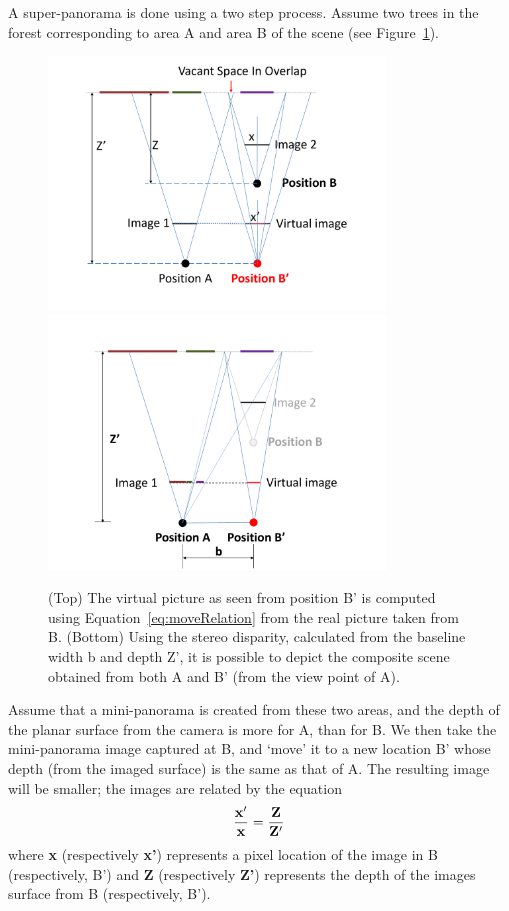A super-panorama is done using a two step process. Assume two trees in
the forest corresponding to area A and area B of the scene (see
Figure~\ref{fig:stereo}). 
\begin{figure}[h!]
  \centering
  \includegraphics[width=0.8\textwidth]{figures/move} \\
  \includegraphics[width=0.8\textwidth]{figures/stereo} 
  \caption[Creation of Super-panoramas]{ \label{fig:stereo} (Top) The virtual
  picture as seen from position B' is computed using Equation~\ref{eq:moveRelation} from the real picture
    taken from B.  (Bottom) Using the stereo disparity, calculated from the baseline 
   width b and depth Z',  it is possible to depict the composite scene obtained from both A
  and B' (from the view point of A).}
\end{figure}    
Assume that a mini-panorama is created from these two areas, and the
depth of the planar surface from the camera is more for A, than for
B. We then take the mini-panorama image captured at B, and `move' it to
a new location B' whose depth (from the imaged surface) is the same as
that of A. The resulting image  will be smaller; the images are
related by the equation
\begin{equation}
  \label{eq:moveRelation}
  {\bf \frac{x'}{x} = \frac{Z}{Z'}}
\end{equation}
where {\bf x} (respectively {\bf x'}) represents a pixel location of
the image in B (respectively, B') and 
{\bf Z} (respectively {\bf Z'}) represents the depth of the images
surface from B (respectively, B').

